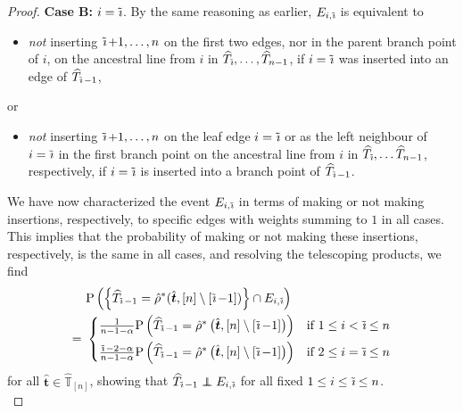 \documentclass[a4paper, final]{amsart}
\theoremstyle{plain}
\theoremstyle{definition}
\newcommand{\that}[1][t]{\hat{\boldsymbol{#1}}} %
\newcommand{\That}[1][T]{\widehat{#1}}
\newcommand{\Thatspace}[1][\T]{\widehat{\boldsymbol{#1}}} %
\newcommand{\T}{\mathbb{T}}
\DeclareMathOperator{\tildei}{\tilde{\textit{\i}}}
\newcommand\independent{\protect\mathpalette{\protect\independenT}{\perp}}
\def\independenT#1#2{\mathrel{\rlap{$#1#2$}\mkern2mu{#1#2}}}
\renewcommand{\P}{\mathrm{P}}
\begin{document}
\begin{proof}
          \textbf{Case B:} $i = \tildei$.
          By the same reasoning as earlier, $E_{i, \tildei}$ is equivalent to
            \begin{itemize}
              \item \textit{not} inserting $\tildei + 1, \ldots, n$ on the first two edges, nor in the parent branch point of $i$, on the ancestral line from $i$ in $\That_{\tildei}, \ldots, \That_{n-1}$, if $i = \tildei$ was inserted into an edge of $\That_{\tildei - 1}$,
            \end{itemize}
            or
            \begin{itemize}
              \item \textit{not} inserting $\tildei + 1, \ldots, n$ on the leaf edge $i = \tildei$ or as the left neighbour of $i = \tildei$ in the first branch point on the ancestral line from $i$ in $\That_{\tildei}, \ldots \That_{n-1}$, respectively, if $i = \tildei$ is inserted into a branch point of $\That_{\tildei - 1}$.
            \end{itemize}
            We have now characterized the event $E_{i,\tildei}$ in terms of making or not making insertions, respectively, to specific edges with weights summing to $1$ in all cases.
            This implies that the probability of making or not making these insertions, respectively, is the same in all cases, and resolving the telescoping products, we find
    \begin{align*}
      &\P \left( \left\{ \That_{\tildei - 1} = \hat{\rho}^* ( \that, [n] \setminus [\tildei - 1] ) \right\} \cap E_{i, \tildei} \right) \\
      =\
      &\begin{cases}
        \frac{1}{n - 1 - \alpha} \P \left( \That_{\tildei - 1} = \hat{\rho}^* \left( \that, [n] \setminus [\tildei - 1] \right) \right) & \text{if $1 \leq i < \tildei \leq n$} \\[0.2cm]
        \frac{\tildei - 2 - \alpha}{n - 1 - \alpha} \P \left( \That_{\tildei - 1} = \hat{\rho}^* \left( \that, [n] \setminus [\tildei - 1] \right) \right) & \text{if $2 \leq i = \tildei \leq n$}
      \end{cases}
    \end{align*}
    for all $\that \in \Thatspace_{[n]}$, showing that $\That_{\tildei - 1} \independent E_{i, \tildei}$ for all fixed $1 \leq i \leq \tildei \leq n$. \\


\end{proof}
\end{document}

